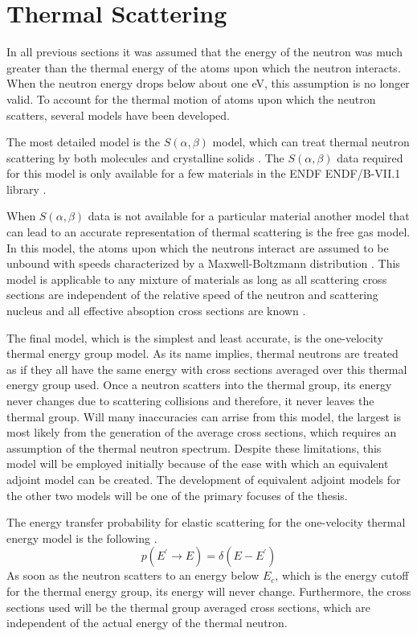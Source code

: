 \section{Thermal Scattering}
In all previous sections it was assumed that the energy of the neutron was
much greater than the thermal energy of the atoms upon which the neutron
interacts. When the neutron energy drops below about one eV, this assumption
is no longer valid. To account for the thermal motion of atoms upon which
the neutron scatters, several models have been developed. 

The most detailed model is the $S(\alpha,\beta)$ model, which can treat thermal 
neutron scattering by both molecules and crystalline solids 
\citep{bell_nuclear_1979, chadwick_endf/b-vii.1_2011}. The $S(\alpha,\beta)$
data required for this model is only available for a few materials in the 
ENDF ENDF/B-VII.1 library \citep{chadwick_endf/b-vii.1_2011}. 

When $S(\alpha,\beta)$ data is not available for a particular material another 
model that can lead to an accurate representation of thermal scattering is
the free gas model. In this model, the atoms upon which the neutrons interact
are assumed to be unbound with speeds characterized by a Maxwell-Boltzmann
distribution \citep{bell_nuclear_1979}. This model is applicable to any
mixture of materials as long as all scattering cross sections are independent
of the relative speed of the neutron and scattering nucleus and all 
effective absoption cross sections are known \citep{bell_nuclear_1979}. 

The final model, which is the simplest and least accurate, is the one-velocity
thermal energy group model. As its name implies, thermal neutrons are treated
as if they all have the same energy with cross sections averaged over this
thermal energy group used. Once a neutron scatters into the thermal group, its
energy never changes due to scattering collisions and therefore, it never leaves
the thermal group. Will many inaccuracies can arrise from this model, the
largest is most likely from the generation of the average cross sections, which
requires an assumption of the thermal neutron spectrum. Despite these
limitations, this model will be employed initially because of the ease with
which an equivalent adjoint model can be created. The development of 
equivalent adjoint models for the other two models will be one of the primary
focuses of the thesis.

The energy transfer probability for elastic scattering for the one-velocity 
thermal energy model is the following \citep{hoogenboom_adjoint_1977}.
\begin{equation}
  p(E^{'} \to E) = \delta(E - E^{'})
\end{equation}
As soon as the neutron scatters to an energy below $E_c$, which is the energy
cutoff for the thermal energy group, its energy will never change. Furthermore,
the cross sections used will be the thermal group averaged cross sections,
which are independent of the actual energy of the thermal neutron. 

